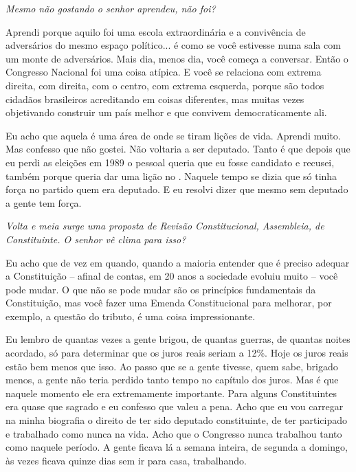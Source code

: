 \medskip

\emph{Mesmo não gostando o senhor aprendeu, não foi?}

Aprendi porque aquilo foi uma escola extraordinária e a
convivência de adversários do mesmo espaço político... é como se você
estivesse numa sala com um monte de adversários. Mais dia, menos dia,
você começa a conversar. Então o Congresso Nacional foi uma coisa
atípica. E você se relaciona com extrema direita, com direita, com o
centro, com extrema esquerda, porque são todos cidadãos brasileiros
acreditando em coisas diferentes, mas muitas vezes objetivando construir
um país melhor e que convivem democraticamente ali.

Eu acho que aquela é uma área de onde se tiram lições de vida. Aprendi
muito. Mas confesso que não gostei. Não voltaria a ser deputado. Tanto é
que depois que eu perdi as eleições em 1989 o pessoal queria que eu
fosse candidato e recusei, também porque queria dar uma lição no .
Naquele tempo se dizia que só tinha força no partido quem era deputado.
E eu resolvi dizer que mesmo sem deputado a gente tem força.

\medskip

\emph{Volta e meia surge uma proposta de Revisão Constitucional,
Assembleia, de Constituinte. O senhor vê clima para isso?}

Eu acho que de vez em quando, quando a maioria entender
que é preciso adequar a Constituição -- afinal de contas, em 20 anos a
sociedade evoluiu muito -- você pode mudar. O que não se pode mudar são
os princípios fundamentais da Constituição, mas você fazer uma Emenda
Constitucional para melhorar, por exemplo, a questão do tributo, é uma
coisa impressionante.

Eu lembro de quantas vezes a gente brigou, de quantas guerras, de
quantas noites acordado, só para determinar que os juros reais seriam a
12\%. Hoje os juros reais estão bem menos que isso. Ao passo que se a
gente tivesse, quem sabe, brigado menos, a gente não teria perdido tanto
tempo no capítulo dos juros. Mas é que naquele momento ele era
extremamente importante. Para alguns Constituintes era quase que sagrado
e eu confesso que valeu a pena. Acho que eu vou carregar na minha
biografia o direito de ter sido deputado constituinte, de ter
participado e trabalhado como nunca na vida. Acho que o Congresso nunca
trabalhou tanto como naquele período. A gente ficava lá a semana
inteira, de segunda a domingo, às vezes ficava quinze dias sem ir para
casa, trabalhando.

